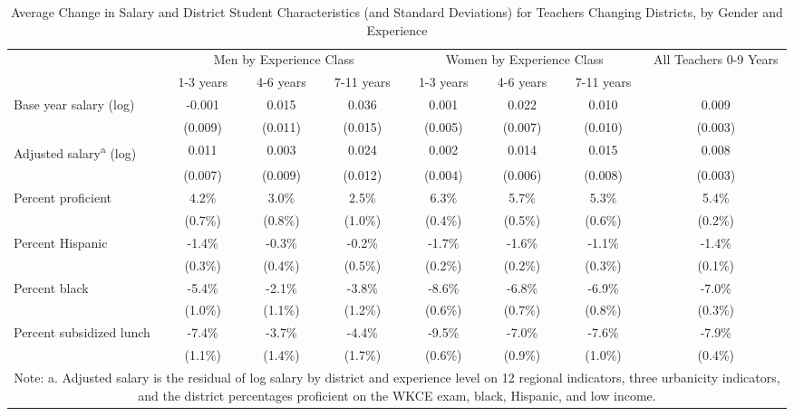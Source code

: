 \documentclass[12pt,]{article}
\begin{document}
\begin{sidewaystable}[htbp]
\centering
\begin{tabular}{lccccccc}
  \hline
 & \multicolumn{3}{c}{Men by Experience Class} & \multicolumn{3}{c}{Women by Experience Class} & \multirow{2}{*}{\parbox{0.1\linewidth}{All Teachers 0-9 Years}}\\ \cline{2-4} \cline{5-7}
 & 1-3 years & 4-6 years & 7-11 years & 1-3 years & 4-6 years & 7-11 years &  \\ 
  \hline
Base year salary (log) & -0.001 & 0.015 & 0.036 & 0.001 & 0.022 & 0.010 & 0.009 \\ 
   & (0.009) & (0.011) & (0.015) & (0.005) & (0.007) & (0.010) & (0.003) \\ 
  Adjusted salary\textsuperscript{a} (log) & 0.011 & 0.003 & 0.024 & 0.002 & 0.014 & 0.015 & 0.008 \\ 
   & (0.007) & (0.009) & (0.012) & (0.004) & (0.006) & (0.008) & (0.003) \\ 
  Percent proficient & 4.2\% & 3.0\% & 2.5\% & 6.3\% & 5.7\% & 5.3\% & 5.4\% \\ 
   & (0.7\%) & (0.8\%) & (1.0\%) & (0.4\%) & (0.5\%) & (0.6\%) & (0.2\%) \\ 
  Percent Hispanic & -1.4\% & -0.3\% & -0.2\% & -1.7\% & -1.6\% & -1.1\% & -1.4\% \\ 
   & (0.3\%) & (0.4\%) & (0.5\%) & (0.2\%) & (0.2\%) & (0.3\%) & (0.1\%) \\ 
  Percent black & -5.4\% & -2.1\% & -3.8\% & -8.6\% & -6.8\% & -6.9\% & -7.0\% \\ 
   & (1.0\%) & (1.1\%) & (1.2\%) & (0.6\%) & (0.7\%) & (0.8\%) & (0.3\%) \\ 
  Percent subsidized lunch & -7.4\% & -3.7\% & -4.4\% & -9.5\% & -7.0\% & -7.6\% & -7.9\% \\ 
   & (1.1\%) & (1.4\%) & (1.7\%) & (0.6\%) & (0.9\%) & (1.0\%) & (0.4\%) \\ 
   \hline
\multicolumn{8}{c}{\parbox{0.85\linewidth}{\scriptsize{Note: a. Adjusted salary is the residual of log salary by district and experience level on 12 regional indicators, three urbanicity indicators, and the district percentages proficient on the WKCE exam, black, Hispanic, and low income.}}}\\
\end{tabular}
\caption{Average Change in Salary and District Student Characteristics (and Standard Deviations) for Teachers Changing Districts, by Gender and Experience} 
\label{tbl:change_by_ge}
\end{sidewaystable}
\end{document}
